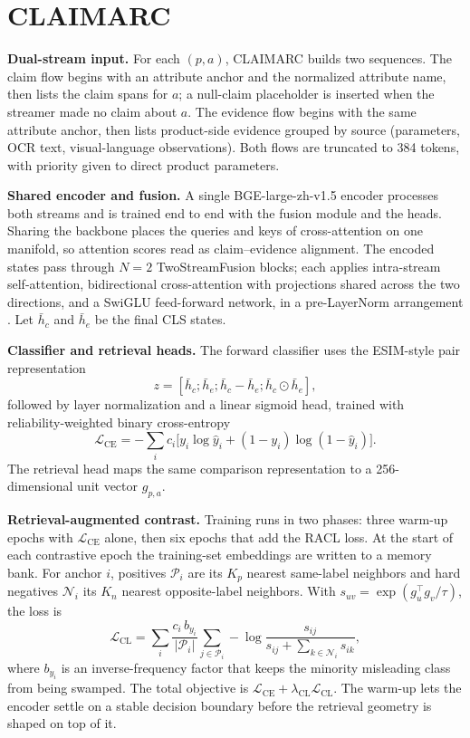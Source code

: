 \documentclass[letterpaper]{article}
\begin{document}
\section{CLAIMARC}

\textbf{Dual-stream input.} For each $(p,a)$, CLAIMARC builds two sequences. The claim flow begins with an attribute anchor and the normalized attribute name, then lists the claim spans for $a$; a null-claim placeholder is inserted when the streamer made no claim about $a$. The evidence flow begins with the same attribute anchor, then lists product-side evidence grouped by source (parameters, OCR text, visual-language observations). Both flows are truncated to 384 tokens, with priority given to direct product parameters.

\textbf{Shared encoder and fusion.} A single BGE-large-zh-v1.5 encoder \citep{xiao2023cpack} processes both streams and is trained end to end with the fusion module and the heads. Sharing the backbone places the queries and keys of cross-attention on one manifold, so attention scores read as claim--evidence alignment. The encoded states pass through $N{=}2$ TwoStreamFusion blocks; each applies intra-stream self-attention, bidirectional cross-attention with projections shared across the two directions, and a SwiGLU feed-forward network, in a pre-LayerNorm arrangement \citep{li2025sarcasm}. Let $\bar h_c$ and $\bar h_e$ be the final CLS states.

\textbf{Classifier and retrieval heads.} The forward classifier uses the ESIM-style pair representation \citep{chen2017esim}
\begin{equation}
z=[\bar h_c;\bar h_e;\bar h_c-\bar h_e;\bar h_c\odot \bar h_e],
\end{equation}
followed by layer normalization and a linear sigmoid head, trained with reliability-weighted binary cross-entropy
\begin{equation}
\mathcal{L}_{\mathrm{CE}}=-\sum_i c_i\big[y_i\log\hat y_i+(1-y_i)\log(1-\hat y_i)\big].
\end{equation}
The retrieval head maps the same comparison representation to a 256-dimensional unit vector $g_{p,a}$.

\textbf{Retrieval-augmented contrast.} Training runs in two phases: three warm-up epochs with $\mathcal{L}_{\mathrm{CE}}$ alone, then six epochs that add the RACL loss. At the start of each contrastive epoch the training-set embeddings are written to a memory bank. For anchor $i$, positives $\mathcal{P}_i$ are its $K_p$ nearest same-label neighbors and hard negatives $\mathcal{N}_i$ its $K_n$ nearest opposite-label neighbors. With $s_{uv}=\exp(g_u^\top g_v/\tau)$, the loss is
\begin{equation}
\mathcal{L}_{\mathrm{CL}}=\sum_i \frac{c_i\, b_{y_i}}{|\mathcal{P}_i|}
\sum_{j\in\mathcal{P}_i}-\log\frac{s_{ij}}{s_{ij}+\sum_{k\in\mathcal{N}_i}s_{ik}},
\end{equation}
where $b_{y_i}$ is an inverse-frequency factor that keeps the minority misleading class from being swamped. The total objective is $\mathcal{L}_{\mathrm{CE}}+\lambda_{\mathrm{CL}}\mathcal{L}_{\mathrm{CL}}$. The warm-up lets the encoder settle on a stable decision boundary before the retrieval geometry is shaped on top of it.
\end{document}
